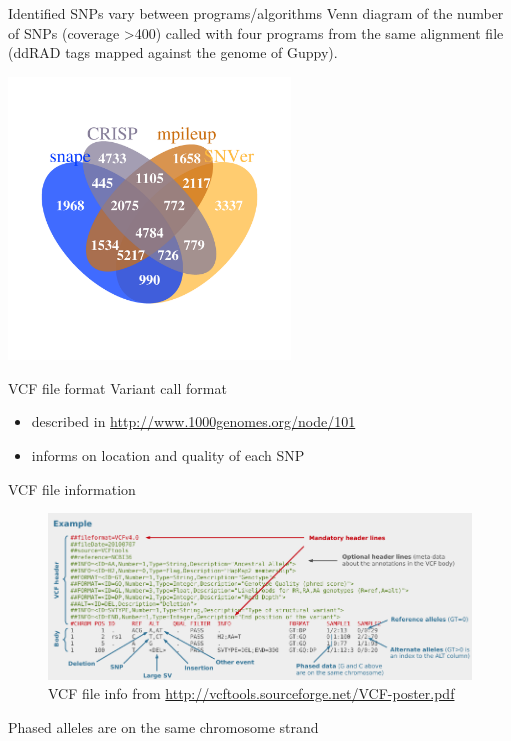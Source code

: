 \documentclass[presentation]{beamer}
\begin{document}
\begin{frame}[label=sec-3-1-12]{Identified SNPs vary between programs/algorithms}
Venn diagram of the number of SNPs (coverage >400) called with four programs from the same alignment file (ddRAD tags mapped against the genome of Guppy).

\begin{center}
\includegraphics[width=7.5cm]{20150204_SNPs400DP.png}

\end{center}
\end{frame}
\begin{frame}[label=sec-3-1-13]{VCF file format}
Variant call format
\begin{itemize}
\item described in \url{http://www.1000genomes.org/node/101}
\item informs on location and quality of each SNP
\end{itemize}
\end{frame}
\begin{frame}[label=sec-3-1-14]{VCF file information}
\begin{center}

\begin{figure}[htb]
\centering
\includegraphics[width=11.5cm]{DanecekVcfFile.png}
\caption{VCF file info from \url{http://vcftools.sourceforge.net/VCF-poster.pdf}}
\end{figure}

Phased alleles are on the same chromosome strand
 \end{center}
\end{frame}
\end{document}
